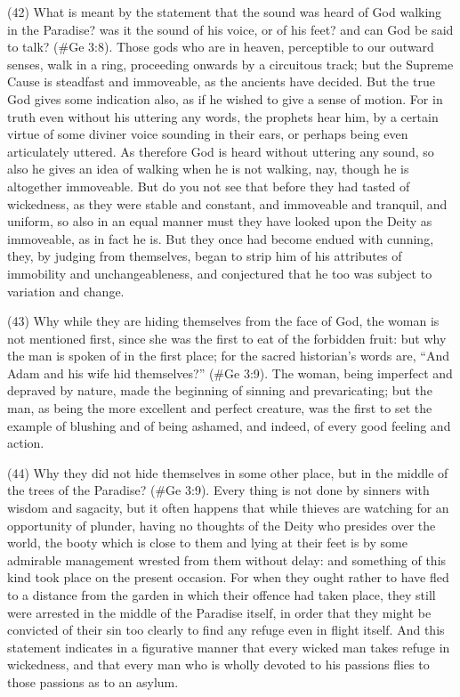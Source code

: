(42) What is meant by the statement that the sound was heard of God walking in the Paradise?
was it the sound of his voice, or of his feet? and can God be said to talk? (\#Ge 3:8). Those
gods who are in heaven, perceptible to our outward senses, walk in a ring, proceeding onwards by
a circuitous track; but the Supreme Cause is steadfast and immoveable, as the ancients have
decided. But the true God gives some indication also, as if he wished to give a sense of motion.
For in truth even without his uttering any words, the prophets hear him, by a certain virtue of some
diviner voice sounding in their ears, or perhaps being even articulately uttered. As therefore God is
heard without uttering any sound, so also he gives an idea of walking when he is not walking, nay,
though he is altogether immoveable. But do you not see that before they had tasted of wickedness,
as they were stable and constant, and immoveable and tranquil, and uniform, so also in an equal
manner must they have looked upon the Deity as immoveable, as in fact he is. But they once had
become endued with cunning, they, by judging from themselves, began to strip him of his attributes
of immobility and unchangeableness, and conjectured that he too was subject to variation and
change.

(43) Why while they are hiding themselves from the face of God, the woman is not mentioned first,
since she was the first to eat of the forbidden fruit: but why the man is spoken of in the first place;
for the sacred historian's words are, ``And Adam and his wife hid themselves?'' (\#Ge 3:9). The
woman, being imperfect and depraved by nature, made the beginning of sinning and prevaricating;
but the man, as being the more excellent and perfect creature, was the first to set the example of
blushing and of being ashamed, and indeed, of every good feeling and action.

(44) Why they did not hide themselves in some other place, but in the middle of the trees of the
Paradise? (\#Ge 3:9). Every thing is not done by sinners with wisdom and sagacity, but it often
happens that while thieves are watching for an opportunity of plunder, having no thoughts of the
Deity who presides over the world, the booty which is close to them and lying at their feet is by
some admirable management wrested from them without delay: and something of this kind took
place on the present occasion. For when they ought rather to have fled to a distance from the
garden in which their offence had taken place, they still were arrested in the middle of the Paradise
itself, in order that they might be convicted of their sin too clearly to find any refuge even in flight
itself. And this statement indicates in a figurative manner that every wicked man takes refuge in
wickedness, and that every man who is wholly devoted to his passions flies to those passions as to
an asylum.

